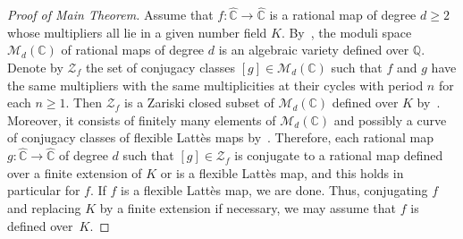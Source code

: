 \documentclass[11pt]{article}
\theoremstyle{plain}
\theoremstyle{definition}
\theoremstyle{remark}
\begin{document}
\begin{proof}[Proof of Main Theorem]
Assume that $f \colon \widehat{\mathbb{C}} \to \widehat{\mathbb{C}}$ is a rational map of degree $d \geq 2$ whose multipliers all lie in a given number field $K$. By~\cite[Th.\,2.1]{S1998}, the moduli space $\mathcal{M}_{d}(\mathbb{C})$ of rational maps of degree $d$ is an algebraic variety defined over $\mathbb{Q}$. Denote by $\mathcal{Z}_{f}$ the set of conjugacy classes $[g] \in \mathcal{M}_{d}(\mathbb{C})$ such that $f$ and $g$ have the same multipliers with the same multiplicities at their cycles with period $n$ for each $n \geq 1$. Then $\mathcal{Z}_{f}$ is a Zariski closed subset of $\mathcal{M}_{d}(\mathbb{C})$ defined over $K$ by~\cite[Th.\,4.5]{S1998}. Moreover, it consists of finitely many elements of $\mathcal{M}_{d}(\mathbb{C})$ and possibly a curve of conjugacy classes of flexible Lattès maps by~\cite[Cor.\,2.3]{MM1987}. Therefore, each rational map $g \colon \widehat{\mathbb{C}} \to \widehat{\mathbb{C}}$ of degree $d$ such that $[g] \in \mathcal{Z}_{f}$ is conjugate to a rational map defined over a finite extension of $K$ or is a flexible Lattès map, and this holds in particular for $f$. If $f$ is a flexible Lattès map, we are done. Thus, conjugating $f$ and replacing $K$ by a finite extension if necessary, we may assume that $f$ is defined over~$K$.


\end{proof}
\end{document}
